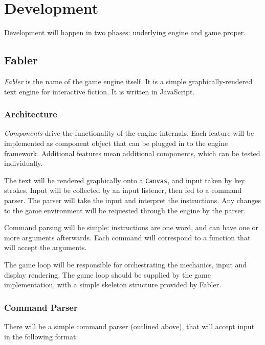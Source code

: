 \documentclass[letterpaper, twoside, 12pt]{memoir}
\begin{document}
\chapter{Development}

Development will happen in two phases: underlying engine and game proper.

\section{Fabler}

\textit{Fabler} is the name of the game engine itself. It is a simple graphically-rendered text engine for interactive fiction. It is written in JavaScript. 

\subsection{Architecture}

\textit{Components} drive the functionality of the engine internals. Each feature will be implemented as component object that can be plugged in to the engine framework. Additional features mean additional components, which can be tested individually.

The text will be rendered graphically onto a \texttt{Canvas}, and input taken by key strokes. Input will be collected by an input listener, then fed to a command parser. The parser will take the input and interpret the instructions. Any changes to the game environment will be requested through the engine by the parser. 

Command parsing will be simple: instructions are one word, and can have one or more arguments afterwards. Each command will correspond to a function that will accept the arguments. 

The game loop will be responsible for orchestrating the mechanics, input and display rendering. The game loop should be supplied by the game implementation, with a simple skeleton structure provided by Fabler.

\subsection{Command Parser}

There will be a simple command parser (outlined above), that will accept input in the following format:

\begin{center}
\end{center}
\end{document}
